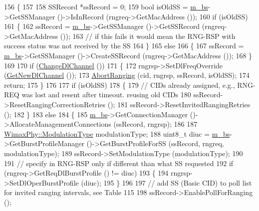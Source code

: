 \begin{DoxyCode}
156 \{
157 
158   SSRecord *ssRecord = 0;
159   \textcolor{keywordtype}{bool} isOldSS = \hyperlink{classns3_1_1BSLinkManager_a03e8b376dd28651abfeded291ea52fc8}{m\_bs}->GetSSManager ()->IsInRecord (rngreq->GetMacAddress ());
160   \textcolor{keywordflow}{if} (isOldSS)
161     \{
162       ssRecord = \hyperlink{classns3_1_1BSLinkManager_a03e8b376dd28651abfeded291ea52fc8}{m\_bs}->GetSSManager ()->GetSSRecord (rngreq->GetMacAddress ());
163       \textcolor{comment}{// if this fails it would mean the RNG-RSP with success status was not received by the SS}
164     \}
165   \textcolor{keywordflow}{else}
166     \{
167       ssRecord = \hyperlink{classns3_1_1BSLinkManager_a03e8b376dd28651abfeded291ea52fc8}{m\_bs}->GetSSManager ()->CreateSSRecord (rngreq->GetMacAddress ());
168     \}
169 
170   \textcolor{keywordflow}{if} (\hyperlink{classns3_1_1BSLinkManager_af433428804a92b8e82256ccaf99c34fc}{ChangeDlChannel} ())
171     \{
172       rngrsp->SetDlFreqOverride (\hyperlink{classns3_1_1BSLinkManager_a7f2cb235a8f2849921f3460b4ab0ac7b}{GetNewDlChannel} ());
173       \hyperlink{classns3_1_1BSLinkManager_a4ff9f6b3fd2578e415c83f604ab88b4e}{AbortRanging} (cid, rngrsp, ssRecord, isOldSS);
174       \textcolor{keywordflow}{return};
175     \}
176 
177   \textcolor{keywordflow}{if} (isOldSS)
178     \{
179       \textcolor{comment}{// CIDs already assigned, e.g., RNG-REQ was lost and resent after timeout. reusing old CIDs}
180       ssRecord->ResetRangingCorrectionRetries ();
181       ssRecord->ResetInvitedRangingRetries ();
182     \}
183   \textcolor{keywordflow}{else}
184     \{
185       \hyperlink{classns3_1_1BSLinkManager_a03e8b376dd28651abfeded291ea52fc8}{m\_bs}->GetConnectionManager ()->AllocateManagementConnections (ssRecord, rngrsp);
186 
187       \hyperlink{classns3_1_1WimaxPhy_a044c5d8a48ca992c39c2a946f6e755fa}{WimaxPhy::ModulationType} modulationType;
188       uint8\_t diuc = \hyperlink{classns3_1_1BSLinkManager_a03e8b376dd28651abfeded291ea52fc8}{m\_bs}->GetBurstProfileManager ()->GetBurstProfileForSS (ssRecord, rngreq, 
      modulationType);
189       ssRecord->SetModulationType (modulationType);
190 
191       \textcolor{comment}{// specify in RNG-RSP only if different than what SS requested}
192       \textcolor{keywordflow}{if} (rngreq->GetReqDlBurstProfile () != diuc)
193         \{
194           rngrsp->SetDlOperBurstProfile (diuc);
195         \}
196 
197       \textcolor{comment}{// add SS (Basic CID) to poll list for invited ranging intervals, see Table 115}
198       ssRecord->EnablePollForRanging ();

\end{DoxyCode}
